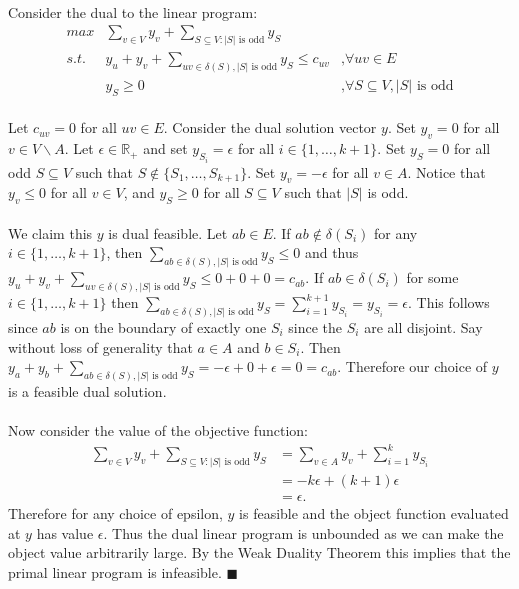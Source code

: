\documentclass[letterpaper,12pt,oneside,onecolumn]{report}
\begin{document}
\paragraph{}
Consider the dual to the linear program:
\begin{align*}
max &\sum_{v\in V} y_v + \sum_{S\subseteq V: |S| \text{ is odd}} y_S \\
s.t. &y_u + y_v + \sum_{uv \in \delta(S), |S| \text{ is odd}} y_S \leq c_{uv} &\text{,}\forall uv \in E \\
&y_S \geq 0 &\text{,}\forall S\subseteq V, |S| \text{ is odd}
\end{align*}
\paragraph{}
Let $c_{uv} = 0$ for all $uv \in E$. Consider the dual solution vector $y$. Set $y_v=0$ for all $v \in V\backslash A$. Let $\epsilon \in \mathbb{R}_+$ and set $y_{S_i} = \epsilon$ for all $i \in \{1, \dots, k+1\}$. Set $y_{S} = 0$ for all odd $S \subseteq V$ such that $S \not \in \{S_1, \dots, S_{k+1}\}$. Set $y_v = -\epsilon$ for all $v \in A$. Notice that $y_v \leq 0$ for all $v \in V$, and $y_S \geq 0$ for all $S \subseteq V$ such that $|S|$ is odd.
\paragraph{}
We claim this $y$ is dual feasible. Let $ab \in E$. If $ab \not\in \delta(S_i)$ for any $i \in \{1, \dots, k+1\}$, then $\sum_{ab \in \delta(S), |S| \text{ is odd}} y_S \leq 0 $ and thus $y_u + y_v + \sum_{uv \in \delta(S), |S| \text{ is odd}} y_S \leq 0 + 0 + 0 = c_{ab}$. If $ab \in \delta(S_i)$  for some $i \in \{1, \dots, k+1\}$ then $\sum_{ab \in \delta(S), |S| \text{ is odd}} y_S = \sum_{i = 1}^{k+1} y_{S_i} = y_{S_i} = \epsilon$. This follows since $ab$ is on the boundary of exactly one $S_i$ since the $S_i$ are all disjoint. Say without loss of generality that $a \in A$ and $b \in S_i$. Then $y_a + y_b + \sum_{ab \in \delta(S), |S| \text{ is odd}} y_S = -\epsilon + 0 + \epsilon = 0 = c_{ab}$. Therefore our choice of $y$ is a feasible dual solution.
\paragraph{}
Now consider the value of the objective function:
\begin{align*}
\sum_{v\in V} y_v + \sum_{S\subseteq V: |S| \text{ is odd}} y_S &= \sum_{v \in A} y_v + \sum_{i=1}^k y_{S_i} \\
&= -k\epsilon + (k+1)\epsilon \\
&= \epsilon.
\end{align*}
Therefore for any choice of epsilon, $y$ is feasible and the object function evaluated at $y$ has value $\epsilon$. Thus the dual linear program is unbounded as we can make the object value arbitrarily large. By the Weak Duality Theorem this implies that the primal linear program is infeasible. $\blacksquare$
\end{document}
